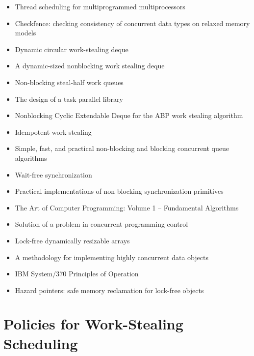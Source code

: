 \begin{itemize}
\item[\checkmark] Thread scheduling for multiprogrammed
  multiprocessors \cite{Arora2001}
\item[\texttimes] Checkfence: checking consistency of concurrent data
  types on relaxed memory models \cite{Burckhardt2007}
\item[\checkmark] Dynamic circular work-stealing deque
  \cite{Chase2005}
\item[\checkmark] A dynamic-sized nonblocking work stealing deque
  \cite{Hendler2006}
\item[\checkmark] Non-blocking steal-half work queues
  \cite{Hendler2002}
\item[\checkmark] The design of a task parallel library
  \cite{Leijen2009}
\item[\checkmark] Nonblocking Cyclic Extendable Deque for the ABP work
  stealing algorithm \cite{Lev2005}
\item[\checkmark] Idempotent work stealing \cite{Michael2009}
\item[\texttimes] Simple, fast, and practical non-blocking and
  blocking concurrent queue algorithms \cite{Michael1996}
\item[\checkmark] Wait-free synchronization \cite{Herlihy1991}
\item[\checkmark] Practical implementations of non-blocking
  synchronization primitives \cite{Moir1997}
\item[\checkmark] The Art of Computer Programming: Volume 1 --
  Fundamental Algorithms \cite{Knuth1997}
\item[\texttimes] Solution of a problem in concurrent programming
  control \cite{Dijkstra1965}
\item[\texttimes] Lock-free dynamically resizable arrays
  \cite{Dechev2006}
\item[\texttimes] A methodology for implementing highly concurrent
  data objects \cite{Herlihy1993}
\item[\checkmark] IBM System/370 Principles of Operation
  \cite{IBM1974}
\item[\checkmark] Hazard pointers: safe memory reclamation for
  lock-free objects \cite{Michael2004}
\end{itemize}


\section*{Policies for Work-Stealing Scheduling}
\label{sec:lr-policies-for-work-stealing-scheduling}

